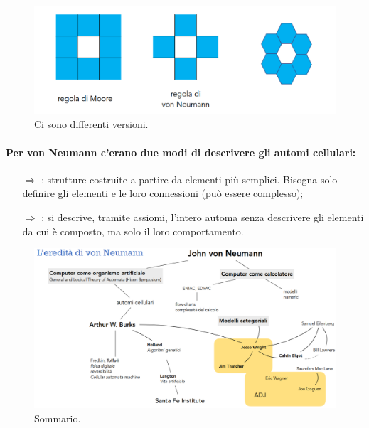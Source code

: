 \begin{figure}[h]
    \centering
    \includegraphics[scale = 0.3]{images/Automi cellulari.png}
    \caption{Ci sono differenti versioni.}
\end{figure}

\paragraph{Per von Neumann c'erano due modi di descrivere gli automi cellulari:}

\begin{itemize}
    \item [$\Rightarrow$] : strutture
    costruite a partire da elementi più semplici. Bisogna solo definire gli elementi e le loro connessioni (può essere complesso);
    \item [$\Rightarrow$] : si descrive, tramite assiomi, l'intero automa senza descrivere
    gli elementi da cui è composto, ma solo il loro comportamento.
\end{itemize}

\begin{figure}[h]
    \centering
    \includegraphics[scale = 0.33]{images/V1.png}
    \caption{Sommario.}
\end{figure}

